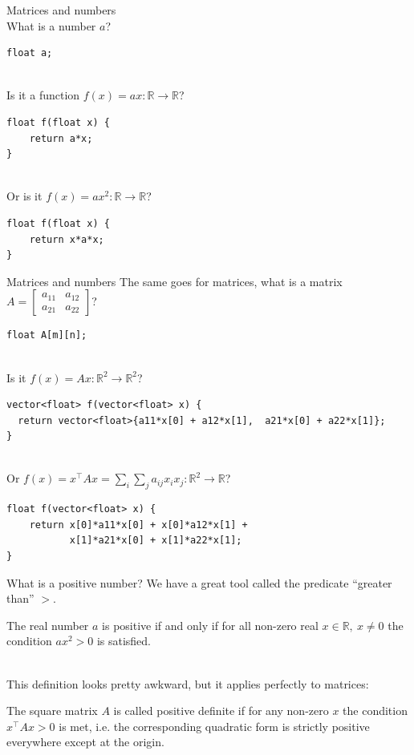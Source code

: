 \documentclass[UKenglish,aspectratio=169]{beamer}
\begin{document}
\begin{frame}[fragile]{Matrices and numbers}
~\\
What is a number $a$?
\begin{verbatim}
float a;
\end{verbatim}
\pause

~\\
Is it a function $f(x)=ax : \mathbb R \rightarrow \mathbb R$?
\pause
\begin{verbatim}
float f(float x) {
    return a*x;
}
\end{verbatim}
\pause

~\\

Or is it $f(x)=ax^2 : \mathbb R \rightarrow \mathbb R$?
\pause
\begin{verbatim}
float f(float x) {
    return x*a*x;
}
\end{verbatim}
\end{frame}

\begin{frame}[fragile]{Matrices and numbers}
The same goes for matrices, what is a matrix $A=\begin{bmatrix} a_{11} & a_{12} \\ a_{21} & a_{22}\end{bmatrix}$?
\pause
\begin{verbatim}
float A[m][n];
\end{verbatim}

\pause
~\\
Is it $f(x) = Ax : \mathbb R^2 \rightarrow \mathbb R^2$?
\begin{verbatim}
vector<float> f(vector<float> x) {
  return vector<float>{a11*x[0] + a12*x[1],  a21*x[0] + a22*x[1]};
}
\end{verbatim}

\pause
~\\
Or $f(x)= x^\top A x = \sum\limits_i\sum\limits_j a_{ij}x_i x_j  : \mathbb R^2 \rightarrow \mathbb R$?
\begin{verbatim}
float f(vector<float> x) {
    return x[0]*a11*x[0] + x[0]*a12*x[1] +
           x[1]*a21*x[0] + x[1]*a22*x[1];
}
\end{verbatim}
\end{frame}

\begin{frame}{What is a positive number?}
We have a great tool called the predicate ``greater than'' $>$.
\pause
\begin{definition}
The real number $a$ is positive if and only if for all non-zero real $x\in\mathbb R,\ x\neq 0$ the condition $ax^2>0$ is satisfied.
\end{definition}
\pause
~\\
This definition looks pretty awkward, but it applies perfectly to matrices:
\begin{definition}
The square matrix $A$ is called positive definite if for any non-zero $x$
the condition $x^\top A x > 0$ is met, i.e. the corresponding quadratic form is strictly positive everywhere except at the origin.
\end{definition}
\end{frame}
\end{document}
